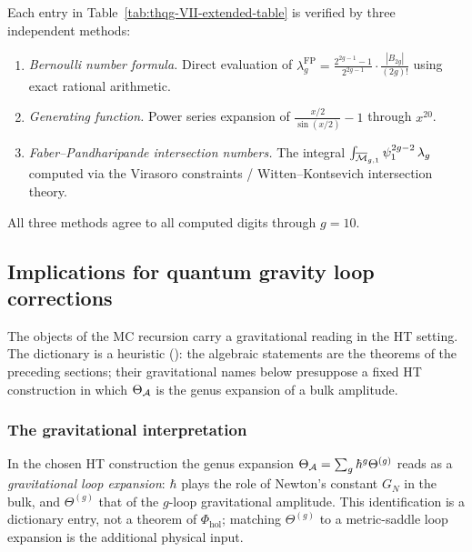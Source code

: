 \begin{remark}
Each entry in Table~\ref{tab:thqg-VII-extended-table} is verified
by three independent methods:
\begin{enumerate}[label=\textup{(\roman*)}]
\item \emph{Bernoulli number formula.}
 Direct evaluation of
 $\lambda_g^{\mathrm{FP}} =
 \frac{2^{2g-1}-1}{2^{2g-1}} \cdot \frac{|B_{2g}|}{(2g)!}$
 using exact rational arithmetic.
\item \emph{Generating function.}
 Power series expansion of
 $\frac{x/2}{\sin(x/2)} - 1$ through $x^{20}$.
\item \emph{Faber--Pandharipande intersection numbers.}
 The integral
 $\int_{\overline{\mathcal{M}}_{g,1}} \psi_1^{2g-2}\, \lambda_g$
 computed via the Virasoro constraints / Witten--Kontsevich
 intersection theory.
\end{enumerate}
All three methods agree to all computed digits through $g = 10$.
\end{remark}

%
%

\subsection{Implications for quantum gravity loop corrections}

The objects of the MC recursion carry a gravitational reading
in the HT setting. The dictionary is a heuristic
(\ClaimStatusHeuristic): the algebraic statements are the theorems
of the preceding sections; their gravitational names below presuppose a
fixed HT construction in which $\Theta_{\mathcal{A}}$ is the genus expansion of a
bulk amplitude.

\subsubsection{The gravitational interpretation}

In the chosen HT construction the genus expansion
$\Theta_{\mathcal{A}} = \sum_g \hbar^g \Theta^{(g)}$ reads as a
\emph{gravitational loop expansion}: $\hbar$ plays the role of
Newton's constant $G_N$ in the bulk, and $\Theta^{(g)}$ that of
the $g$-loop gravitational amplitude. This identification is a
dictionary entry, not a theorem of $\Phi_{\mathrm{hol}}$; matching
$\Theta^{(g)}$ to a metric-saddle loop expansion is the additional
physical input.

